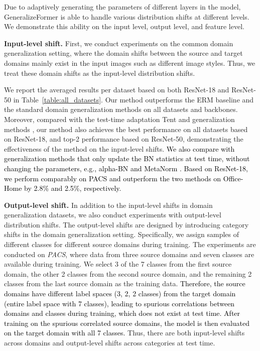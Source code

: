 Due to adaptively generating the parameters of different layers in the model, GeneralizeFormer is able to handle various distribution shifts at different levels. We demonstrate this ability on the input level, output level, and feature level.

\noindent
\textbf{Input-level shift.} 
First, we conduct experiments on the common domain generalization setting, where the domain shifts between the source and target domains mainly exist in the input images such as different image styles. Thus, we treat these domain shifts as the input-level distribution shifts. 

We report the averaged results per dataset based on both ResNet-18 and ResNet-50 in Table~\ref{table:all_datasets}.
Our method outperforms the ERM baseline and the standard domain generalization methods on all datasets and backbones.
Moreover, compared with the test-time adaptation Tent and generalization methods \cite{iwasawa2021test, chen2023improved, xiao2022learning, jang2022test}, our method also achieves the best performance on all datasets based on ResNet-18, and top-2 performance based on ResNet-50, demonstrating the effectiveness of the method on the input-level shifts. 
\textcolor{black}{We also compare with generalization methods that only update the BN statistics at test time, without changing the parameters, e.g., alpha-BN \cite{you2021test} and MetaNorm \cite{du2020metanorm}. Based on ResNet-18, we perform comparably on PACS and outperform the two methods on Office-Home by 2.8\% and 2.5\%, respectively.}





\noindent
\textbf{Output-level shift.}
In addition to the input-level shifts in domain generalization datasets, we also conduct experiments with output-level distribution shifts. 
The output-level shifts are designed by introducing category shifts \cite{shen2022association, park2023test} in the domain generalization setting.
Specifically, we assign samples of different classes for different source domains during training.
The experiments are conducted on \textit{PACS}, where data from three source domains and seven classes are available during training. 
We select 3 of the 7 classes from the first source domain, the other 2 classes from the second source domain, and the remaining 2 classes from the last source domain as the training data.
\textcolor{black}{Therefore, the source domains have different label spaces (3, 2, 2 classes) from the target domain (entire label space with 7 classes), leading to spurious correlations between domains and classes during training, which does not exist at test time.
After training on the spurious correlated source domains, the model is then evaluated on the target domain with all 7 classes.}
Thus, there are both input-level shifts across domains and output-level shifts across categories at test time.

